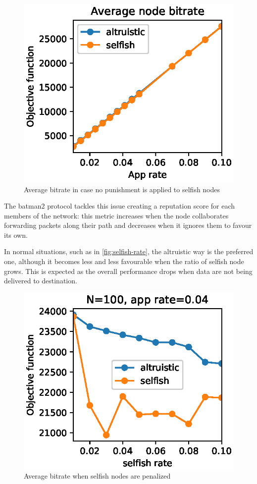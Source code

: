 \documentclass[conference,10.5pt]{IEEEtran}
\begin{document}
\begin{figure}[h]
  \includegraphics{figures/obj_func_vs_app_rate_no_punish.eps}
  \caption{Average bitrate in case no punishment is applied to selfish nodes}
  \label{fig:no-blame-app-rate}
\end{figure}

The \gls{batman2} protocol tackles this issue creating a reputation score for each members of the network: this metric increases when the node collaborates forwarding packets along their path and decreases when it ignores them to favour its own.

In normal situations, such as in \autoref{fig:selfish-rate}, the altruistic way is the preferred one, although it becomes less and less favourable when the ratio of selfish node grows. This is expected as the overall performance drops when data are not being delivered to destination.

\begin{figure}[h]
  \includegraphics{figures/obj_func_vs_selfish_rate_selfish_degrade.eps}
  \caption{Average bitrate when selfish nodes are penalized}
  \label{fig:selfish-rate}
\end{figure}
\end{document}
